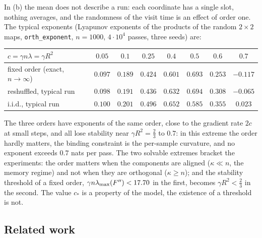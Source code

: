 \noindent In (b) the mean does not describe a run: each coordinate has a single slot, nothing averages, and the randomness of the visit time is an effect of order one. The typical exponents (Lyapunov exponents of the products of the random $2\times2$ maps, \texttt{orth\_exponent}, $n=1000$, $4\cdot10^4$ passes, three seeds) are:
\begin{center}
\footnotesize
\begin{tabular}{@{}lccccccc@{}}
\toprule
$c=\gamma n\lambda=\gamma R^2$ & $0.05$ & $0.1$ & $0.25$ & $0.4$ & $0.5$ & $0.6$ & $0.7$ \\
\midrule
fixed order (exact, $n\to\infty$) & $0.097$ & $0.189$ & $0.424$ & $0.601$ & $0.693$ & $0.253$ & $-0.117$ \\
reshuffled, typical run & $0.098$ & $0.191$ & $0.436$ & $0.632$ & $0.694$ & $0.308$ & $-0.065$ \\
i.i.d., typical run & $0.100$ & $0.201$ & $0.496$ & $0.652$ & $0.585$ & $0.355$ & $0.023$ \\
\bottomrule
\end{tabular}
\end{center}
\noindent The three orders have exponents of the same order, close to the gradient rate $2c$ at small steps, and all lose stability near $\gamma R^2=\frac23$ to $0.7$: in this extreme the order hardly matters, the binding constraint is the per-sample curvature, and no exponent exceeds $0.7$ nats per pass. The two solvable extremes bracket the experiments: the order matters when the components are aligned ($\kappa\ll n$, the memory regime) and not when they are orthogonal ($\kappa\ge n$); and the stability threshold of a fixed order, $\gamma n\lambda_{\max}(F'')<17.70$ in the first, becomes $\gamma R^2<\frac23$ in the second. The value $c_\ast$ is a property of the model, the existence of a threshold is not.

\subsection{Related work}\label{sec:B4-related}

